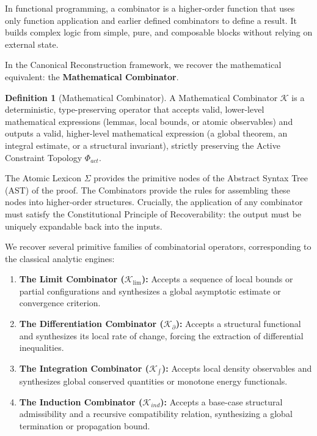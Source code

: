 \documentclass[12pt,openany]{extbook}
\theoremstyle{plain}
\theoremstyle{definition}
\newtheorem{definition}{Definition}[chapter]
\begin{document}
In functional programming, a combinator is a higher-order function that uses only function application and earlier defined combinators to define a result. It builds complex logic from simple, pure, and composable blocks without relying on external state.

In the Canonical Reconstruction framework, we recover the mathematical equivalent: the \textbf{Mathematical Combinator}.

\begin{definition}[Mathematical Combinator]
A Mathematical Combinator $\mathcal{K}$ is a deterministic, type-preserving operator that accepts valid, lower-level mathematical expressions (lemmas, local bounds, or atomic observables) and outputs a valid, higher-level mathematical expression (a global theorem, an integral estimate, or a structural invariant), strictly preserving the Active Constraint Topology $\Phi_{act}$.
\end{definition}

The Atomic Lexicon $\Sigma$ provides the primitive nodes of the Abstract Syntax Tree (AST) of the proof. The Combinators provide the rules for assembling these nodes into higher-order structures. Crucially, the application of any combinator must satisfy the Constitutional Principle of Recoverability: the output must be uniquely expandable back into the inputs.

We recover several primitive families of combinatorial operators, corresponding to the classical analytic engines:

\begin{enumerate}
    \item \textbf{The Limit Combinator ($\mathcal{K}_{\lim}$):} Accepts a sequence of local bounds or partial configurations and synthesizes a global asymptotic estimate or convergence criterion.
    \item \textbf{The Differentiation Combinator ($\mathcal{K}_{\partial}$):} Accepts a structural functional and synthesizes its local rate of change, forcing the extraction of differential inequalities.
    \item \textbf{The Integration Combinator ($\mathcal{K}_{\int}$):} Accepts local density observables and synthesizes global conserved quantities or monotone energy functionals.
    \item \textbf{The Induction Combinator ($\mathcal{K}_{ind}$):} Accepts a base-case structural admissibility and a recursive compatibility relation, synthesizing a global termination or propagation bound.
\end{enumerate}
\end{document}
